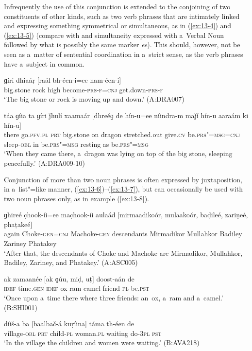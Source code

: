 Infrequently the use of this conjunction is extended to the conjoining of two constituents of other kinds, such as two verb phrases that are intimately linked and expressing something symmetrical or simultaneous, as in (\ref{ex:13-4}) and (\ref{ex:13-5}) (compare with  and simultaneity expressed with a~Verbal Noun followed by what is possibly the same marker \textit{ee}). This should, however, not be seen as a~matter of sentential coordination in a~strict sense, as the verb phrases have a~subject in common.

\begin{exe}
\ex
\label{ex:13-4}
\gll ɡíri dhiaáṛ [raál bh-éen-i=ee nam-éen-i]  \\
big.stone rock high become-\textsc{prs-f=cnj} get.down-\textsc{prs-f}  \\
\glt `The big stone or rock is moving up and down.' (A:DRA007)

\ex
\label{ex:13-5}
\gll táa ɡíia ta ɡíri ǰhulí xaamaár [dhreéɡ de hín-u=ee níindra-m maǰí hín-u aaraám ki hín-u] \\
there go.\textsc{pfv.pl} \textsc{prt} big.stone on dragon stretched.out  give.\textsc{cv} be.\textsc{prs"=msg=cnj} sleep-\textsc{obl} in be.\textsc{prs"=msg}  resting as be.\textsc{prs"=msg}  \\
\glt `When they came there, a~dragon was lying on top of the big stone, sleeping peacefully.' (A:DRA009-10) 
\end{exe}

 Conjunction of more than two noun phrases is often expressed by juxtaposition, in a~list"=like manner, (\ref{ex:13-6})--(\ref{ex:13-7}), but can occasionally be used with two noun phrases only, as in example (\ref{ex:13-8}).

\begin{exe}
\ex
\label{ex:13-6}
\gll ɡhireé c̣hook-íi=ee mac̣hook-íi aulaád [mirmaadikoór, mulaakoór, baḍileé, zariṇeé, phaṭakeé] \\
again Choke-\textsc{gen=cnj} Machoke-\textsc{gen} descendants  Mirmadikor Mullahkor Badiley Zariney Phatakey \\
\glt `After that, the descendants of Choke and Machoke are Mirmadikor, Mullahkor, Badiley, Zariney, and Phatakey.' (A:ASC005)

\ex
\label{ex:13-7}
\gll ak zamaanée [ak ɡúu, miḍ, uṭ] doost-aán de \\
\textsc{idef} time.\textsc{gen} \textsc{ idef} ox ram camel friend-\textsc{pl}  be.\textsc{pst}  \\
\glt `Once upon a~time there where three friends: an~ox, a~ram and a~camel.' (B:SHI001)

\ex
\label{ex:13-8}
\gll díiš-a ba [baalbač-á kuṛíina] táma th-éen de \\
village-\textsc{obl} \textsc{prt} child-\textsc{pl} woman.\textsc{pl} waiting do-\textsc{3pl} \textsc{pst}  \\
\glt `In the village the children and women were waiting.' (B:AVA218) 
\end{exe}

